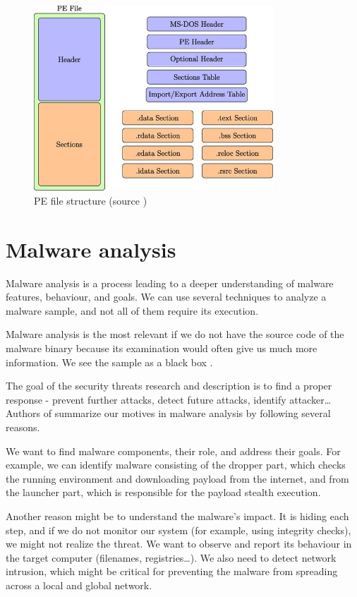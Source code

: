 \begin{figure}[h]
  \centering
  \includegraphics[width=0.8\textwidth]{figures/pe.jpg}
  \caption{PE file structure (source \cite{Gibert2020})}
  \label{fig:pe}
\end{figure}

\section{Malware analysis}
Malware analysis is a process leading to a deeper understanding of malware features, behaviour, and goals. We can use several techniques to analyze a malware sample, and not all of them require its execution.

Malware analysis is the most relevant if we do not have the source code of the malware binary because its examination would often give us much more information. We see the sample as a black box \cite{Sikorski2012}.

The goal of the security threats research and description is to find a proper response - prevent further attacks, detect future attacks, identify attacker\dots Authors of \cite{KA2018} summarize our motives in malware analysis by following several reasons. 

We want to find malware components, their role, and address their goals. For example, we can identify malware consisting of the dropper part, which checks the running environment and downloading payload from the internet, and from the launcher part, which is responsible for the payload stealth execution. 

Another reason might be to understand the malware's impact. It is hiding each step, and if we do not monitor our system (for example, using integrity checks), we might not realize the threat. We want to observe and report its behaviour in the target computer (filenames, registries\dots). We also need to detect network intrusion, which might be critical for preventing the malware from spreading across a local and global network. 

